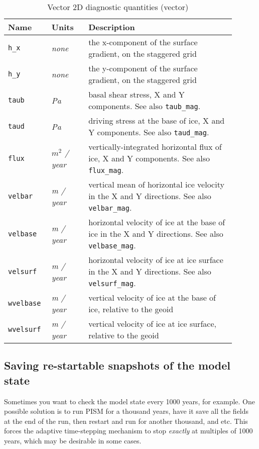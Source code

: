 \begin{table}[ht]
  \centering
  \begin{tabular}{p{0.15\linewidth}p{0.15\linewidth}p{0.6\linewidth}}
    \toprule
    \textbf{Name} & \textbf{Units} & \textbf{Description} \\
    \midrule
    \texttt{h_x} & \textsl{none} &  the x-component of the surface gradient, on the staggered grid\\
    \texttt{h_y} & \textsl{none} &  the y-component of the surface gradient, on the staggered grid\\
    \texttt{taub} & \textsl{Pa} & basal shear stress, X and Y components. See also \texttt{taub_mag}. \\
    \texttt{taud} & \textsl{Pa} & driving stress at the base of ice, X and Y components. See also \texttt{taud_mag}. \\
    \texttt{flux} & \textsl{$m^{2}$ / year} & vertically-integrated horizontal flux of ice, X and Y components. See also \texttt{flux_mag}. \\
    \texttt{velbar} & \textsl{m / year} &  vertical mean of horizontal ice velocity in the X and Y directions. See also \texttt{velbar_mag}. \\
    \texttt{velbase} & \textsl{m / year} &  horizontal velocity of ice at the base of ice in the X and Y directions. See also \texttt{velbase_mag}. \\
    \texttt{velsurf} & \textsl{m / year} &  horizontal velocity of ice at ice surface in the X and Y directions. See also \texttt{velsurf_mag}.\\
    \texttt{wvelbase} & \textsl{m / year} &  vertical velocity of ice at the base of ice, relative to the geoid \\
    \texttt{wvelsurf} & \textsl{m / year} &  vertical velocity of ice at ice surface, relative to the geoid \\
    \bottomrule
  \end{tabular}
  \caption{Vector 2D diagnostic quantities (vector)}
  \label{tab:two-d-diagnostics-vector}
\end{table}

\clearpage

\subsection{Saving re-startable snapshots of the model state}
\label{sec:snapshots}
Sometimes you want to check the model state every 1000 years, for example.  One possible solution is to run PISM for a thousand years, have it save all the fields at the end of the run, then restart and run for another thousand, and etc.  This forces the adaptive time-stepping mechanism to stop \emph{exactly} at multiples of 1000 years, which may be desirable in some cases.


